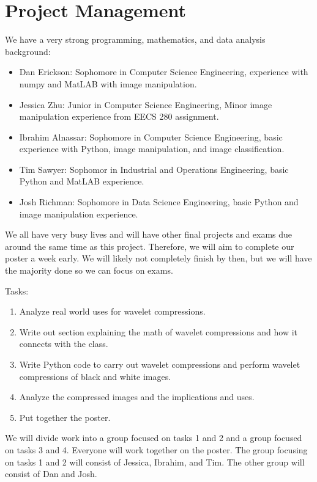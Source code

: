 \documentclass[12pt]{article}
\begin{document}
\section{Project Management}

We have a very strong programming, mathematics, and data analysis background:

\begin{itemize}
	\item Dan Erickson: Sophomore in Computer Science Engineering, experience with numpy and MatLAB with image manipulation.
	\item Jessica Zhu: Junior in Computer Science Engineering, Minor image manipulation experience from EECS 280 assignment. 
	\item Ibrahim Alnassar: Sophomore in Computer Science Engineering, basic experience with Python, image manipulation, and image classification.
	\item Tim Sawyer: Sophomor in Industrial and Operations Engineering, basic Python and MatLAB experience.
	\item Josh Richman: Sophomore in Data Science Engineering, basic Python and image manipulation experience.
\end{itemize}

We all have very busy lives and will have other final projects and exams due around the same time as this project. Therefore, we will aim to complete our poster a week early. We will likely not completely finish by then, but we will have the majority done so we can focus on exams.

Tasks:
\begin{enumerate}
	\item Analyze real world uses for wavelet compressions.
	\item Write out section explaining the math of wavelet compressions and how it connects with the class.
	\item Write Python code to carry out wavelet compressions and perform wavelet compressions of black and white images.
	\item Analyze the compressed images and the implications and uses.
	\item Put together the poster.
\end{enumerate}

We will divide work into a group focused on tasks 1 and 2 and a group focused on tasks 3 and 4. Everyone will work together on the poster. The group focusing on tasks 1 and 2 will consist of Jessica, Ibrahim, and Tim. The other group will consist of Dan and Josh.
\end{document}
